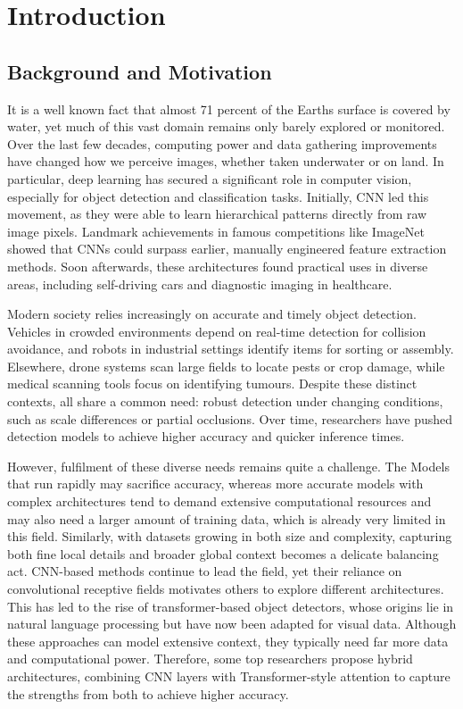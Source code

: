 
\chapter{Introduction}
\section{Background and Motivation}
It is a well known fact that almost 71 percent of the Earths surface is covered by water, yet much of this vast domain remains only barely explored or monitored. Over the last few decades, computing power and data gathering improvements have changed how we perceive images, whether taken underwater or on land. In particular, deep learning has secured a significant role in computer vision, especially for object detection and classification tasks. Initially, CNN led this movement, as they were able to learn hierarchical patterns directly from raw image pixels. Landmark achievements in famous competitions like ImageNet showed that CNNs could surpass earlier, manually engineered feature extraction methods. Soon afterwards, these architectures found practical uses in diverse areas, including self-driving cars and diagnostic imaging in healthcare.
    
Modern society relies increasingly on accurate and timely object detection. Vehicles in crowded environments depend on real-time detection for collision avoidance, and robots in industrial settings identify items for sorting or assembly. Elsewhere, drone systems scan large fields to locate pests or crop damage, while medical scanning tools focus on identifying tumours. Despite these distinct contexts, all share a common need: robust detection under changing conditions, such as scale differences or partial occlusions. Over time, researchers have pushed detection models to achieve higher accuracy and quicker inference times.

However, fulfilment of these diverse needs remains quite a challenge. The Models that run rapidly may sacrifice accuracy, whereas more accurate models with complex architectures tend to demand extensive computational resources and may also need a larger amount of training data, which is already very limited in this field. Similarly, with datasets growing in both size and complexity, capturing both fine local details and broader global context becomes a delicate balancing act. CNN-based methods continue to lead the field, yet their reliance on convolutional receptive fields motivates others to explore different architectures. This has led to the rise of transformer-based object detectors, whose origins lie in natural language processing but have now been adapted for visual data. Although these approaches can model extensive context, they typically need far more data and computational power. Therefore, some top researchers propose hybrid architectures, combining CNN layers with Transformer-style attention to capture the strengths from both to achieve higher accuracy.

